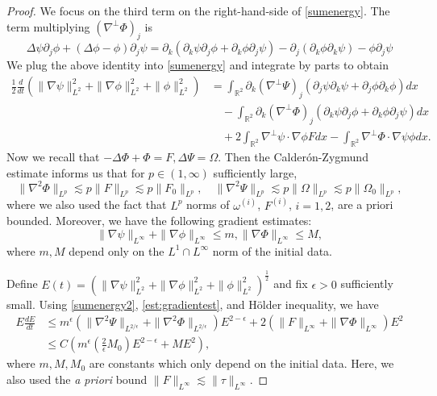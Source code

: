 \documentclass[11pt,reqno]{amsproc}
\newcommand{\pa}{\partial}
\newcommand{\na}{\nabla}
\newcommand{\R}{\mathbb{R}}
\newcommand{\D}{\Delta}
\begin{document}
\begin{proof}
We focus on the third term on the right-hand-side of \eqref{sumenergy}. The term multiplying $(\na^{\perp} \Phi)_j$ is
\[
\D \psi \pa_j\phi + (\D\phi -\phi)\pa_j\psi = \pa_k(\pa_k\psi \pa_j \phi + \pa_k\phi \pa_j\psi) -\pa_j(\pa_k\phi\pa_k\psi) - \phi \pa_j\psi
\]
We plug the above identity into \eqref{sumenergy} and integrate by parts to obtain
\begin{equation}
    \label{sumenergy2}
    \begin{split}
    \frac12 \frac{d}{dt}\left(\|\na \psi\|_{L^2}^2+\|\na\phi\|_{L^2}^2 + \|\phi\|_{L^2}^2\right) &= \int_{\R^2} \pa_k (\na^\perp\Psi)_j (\pa_j\psi \pa_k\psi + \pa_j\phi \pa_k\phi) dx \\
    &\quad- \int_{\R^2} \pa_k(\na^\perp \Phi)_j(\pa_k\psi \pa_j\phi + \pa_k\phi\pa_j\psi) dx\\
    &\quad+ 2\int_{\R^2}\na^\perp \psi \cdot \na \phi F dx - \int_{\R^2}\na^\perp \Phi\cdot \na \psi \phi dx.
    \end{split}
\end{equation}
Now we recall that 
$
-\Delta \Phi + \Phi = F,\Delta \Psi = \Omega.
$
Then the Calder\'on-Zygmund estimate informs us that for $p \in (1,\infty)$ sufficiently large,
\begin{equation}
    \label{est:LpCZ}
    \|\na^2\Phi\|_{L^p} \lesssim p \|F\|_{L^p} \lesssim p\|F_0\|_{L^p},\quad \|\na^2 \Psi\|_{L^p} \lesssim p\|\Omega\|_{L^p} \lesssim p\|\Omega_0\|_{L^p},
\end{equation}
where we also used the fact that $L^p$ norms of $\omega^{(i)}$, $F^{(i)}$, $i = 1,2$, are a priori bounded. Moreover, we have the following gradient estimates:
\begin{equation}
    \label{est:gradientest}
    \|\na \psi\|_{L^\infty} + \|\na \phi\|_{L^\infty} \le m, \|\na \Phi\|_{L^\infty} \le M,
\end{equation}
where $m, M$ depend only on the $L^1\cap L^\infty$ norm of the initial data. 

Define $E(t) = (\|\na \psi\|_{L^2}^2+\|\na\phi\|_{L^2}^2 + \|\phi\|_{L^2}^2)^\frac12$ and fix $\epsilon > 0$ sufficiently small. Using \eqref{sumenergy2}, \eqref{est:gradientest}, and H\"older inequality, we have
\begin{equation}\label{est:energy}
\begin{split}
    E\frac{dE}{dt} &\le m^\epsilon (\|\na^2 \Psi\|_{L^{2/\epsilon}} + \|\na^2 \Phi\|_{L^{2/\epsilon}})E^{2-\epsilon} + 2(\|F\|_{L^\infty} + \|\na \Phi\|_{L^\infty}) E^2\\
    &\le C \left(m^\epsilon \left(\frac{2}{\epsilon}M_0\right) E^{2-\epsilon} + M E^2\right),
\end{split}
\end{equation}
where $m, M, M_0$ are constants which only depend on the initial data. Here, we also used the \textit{a priori} bound $\|F\|_{L^\infty} \lesssim \|\tau\|_{L^\infty}$.


\end{proof}
\end{document}

